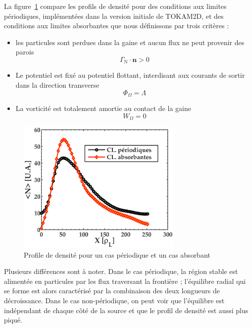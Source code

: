 \begin{refsection}
	La figure~\ref{2-profileDenNoLimit} compare les profils de densité pour des
	conditions aux limites périodiques, implémentées dans la version initiale de
	TOKAM2D, et des conditions aux limites absorbantes que nous définissons par
	trois critères :
	
	\begin{itemize}
	  \item les particules sont perdues dans la gaine et aucun flux ne peut
	  provenir des parois 
	  \begin{equation}
	  	\Gamma_\text{N}\cdot\mathbf n>0
	  \end{equation}
	  \item Le
	potentiel est fixé au potentiel flottant, interdisant aux
	courants de sortir dans la direction transverse
	\begin{equation}
	  	\Phi_\Omega=\Lambda
	  \end{equation}
	\item La vorticité est totalement amortie au contact de la gaine 
	\begin{equation}
	  	W_\Omega=0
	  \end{equation}
	\end{itemize}
	
\begin{figure}[!htbp]
\centering
    \includegraphics[width=8cm]{figures/2-profileDenNoLimit.eps}
    \caption{Profile de densité pour un cas périodique et un cas
    absorbant\label{2-profileDenNoLimit}}
\end{figure}
	Plusieurs différences sont à noter. Dans le cas périodique, la région stable
	est alimentée en particules par les flux traversant la frontière ; l'équilibre radial qui se
	forme est alors caractérisé par la combinaison des deux longueurs de
	décroissance.
	Dans le cas non-périodique, on peut voir que l'équilibre est indépendant de
	chaque côté de la source et que le profil de densité est aussi plus piqué. 
	

\end{refsection}
